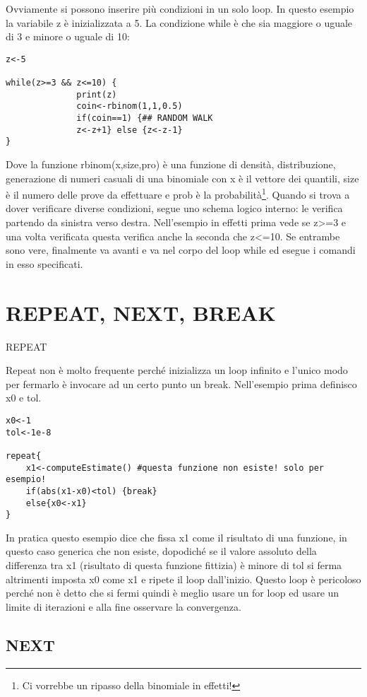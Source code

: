 Ovviamente si possono inserire più condizioni in un solo loop.
In questo esempio la variabile z è inizializzata a 5. La condizione while è che sia maggiore o uguale di 3 e minore o uguale di 10:
\begin{lstlisting}
z<-5

while(z>=3 && z<=10) {
		      print(z)
		      coin<-rbinom(1,1,0.5)
		      if(coin==1) {## RANDOM WALK
		      z<-z+1} else {z<-z-1}
}
\end{lstlisting}

Dove la funzione rbinom(x,size,pro) è una funzione di densità, distribuzione,
generazione di numeri casuali di una binomiale con x è il vettore dei quantili,
size è il numero delle prove da effettuare e prob è la probabilità\footnote{Ci vorrebbe
un ripasso della binomiale in effetti!}.
Quando \erre si trova a dover verificare diverse condizioni, segue uno schema
logico interno: le verifica partendo da sinistra verso destra.
Nell'esempio in effetti prima vede se z>=3 e una volta verificata questa 
verifica anche la seconda che z<=10.
Se entrambe sono vere, finalmente \erre va avanti e va nel corpo del loop while
ed esegue i comandi in esso specificati.


\section{REPEAT, NEXT, BREAK}

REPEAT

Repeat non è molto frequente perché inizializza un loop infinito e l'unico modo per fermarlo è invocare ad un certo punto un break.
Nell'esempio prima definisco x0 e tol.

\begin{lstlisting}
x0<-1
tol<-1e-8

repeat{
	x1<-computeEstimate() #questa funzione non esiste! solo per esempio!
	if(abs(x1-x0)<tol) {break}
	else{x0<-x1}
}

\end{lstlisting}
In pratica questo esempio dice che fissa x1 come il risultato di una funzione, in questo caso generica che non esiste, dopodiché se il valore assoluto della differenza tra x1 (risultato di questa funzione fittizia) è minore di tol si ferma altrimenti imposta x0 come x1 e ripete il loop dall'inizio.
Questo loop è pericoloso perché non è detto che si fermi quindi è meglio usare un for
loop ed usare un limite di iterazioni e alla fine osservare la convergenza.

\subsection{NEXT}

